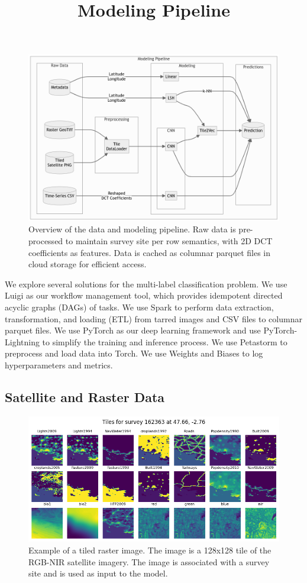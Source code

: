 \begin{figure}[h!]
  \centering
  \title{Modeling Pipeline}
  \includegraphics[width=\textwidth]{figures/pipeline4.png}
  \caption{
    Overview of the data and modeling pipeline.
    Raw data is pre-processed to maintain survey site per row semantics, with 2D DCT coefficients as features.
    Data is cached as columnar parquet files in cloud storage for efficient access.
  }
  \label{fig:tiled-raster}
\end{figure}

We explore several solutions for the multi-label classification problem. 
We use Luigi \cite{Rouhani2024spotify} as our workflow management tool, which provides idempotent directed acyclic graphs (DAGs) of tasks. 
We use Spark \cite{armbrust2015spark} to perform data extraction, transformation, and loading (ETL) from tarred images and CSV files to columnar parquet files. 
We use PyTorch as our deep learning framework and use PyTorch-Lightning to simplify the training and inference process.
We use Petastorm to preprocess and load data into Torch.
We use Weights and Biases to log hyperparameters and metrics.

\subsection{Satellite and Raster Data}

\begin{figure}[h!]
  \centering
  \includegraphics[width=\textwidth]{figures/tiles3.png}
  \caption{
      Example of a tiled raster image. 
      The image is a 128x128 tile of the RGB-NIR satellite imagery. 
      The image is associated with a survey site and is used as input to the model. 
  }
  \label{fig:tiled-raster}
\end{figure}

